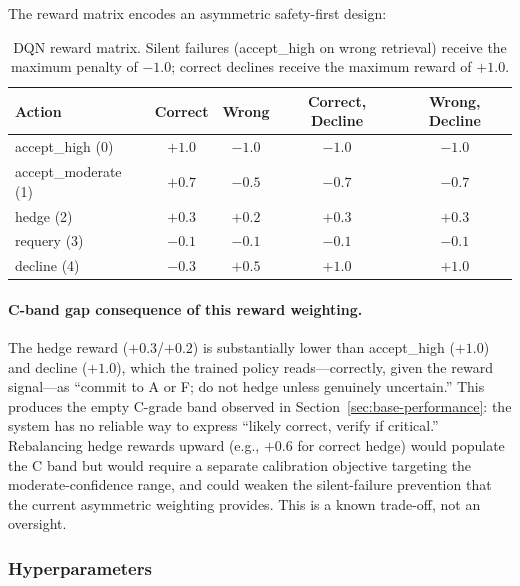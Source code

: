 \documentclass[11pt,letterpaper]{article}
\begin{document}
The reward matrix encodes an asymmetric safety-first design:

\begin{table}[H]
\centering
\small
\begin{tabular}{lcccc}
\toprule
\textbf{Action} & \textbf{Correct} & \textbf{Wrong} & \textbf{Correct, Decline} & \textbf{Wrong, Decline} \\
\midrule
accept\_high (0) & $+1.0$ & $\mathbf{-1.0}$ & $-1.0$ & $-1.0$ \\
accept\_moderate (1) & $+0.7$ & $-0.5$ & $-0.7$ & $-0.7$ \\
hedge (2) & $+0.3$ & $+0.2$ & $+0.3$ & $+0.3$ \\
requery (3) & $-0.1$ & $-0.1$ & $-0.1$ & $-0.1$ \\
decline (4) & $-0.3$ & $+0.5$ & $\mathbf{+1.0}$ & $\mathbf{+1.0}$ \\
\bottomrule
\end{tabular}
\caption{DQN reward matrix. Silent failures (accept\_high on wrong retrieval) receive the maximum penalty of $-1.0$; correct declines receive the maximum reward of $+1.0$.}
\label{tab:reward-matrix}
\end{table}

\paragraph{C-band gap consequence of this reward weighting.} The hedge reward ($+0.3$/$+0.2$) is substantially lower than accept\_high ($+1.0$) and decline ($+1.0$), which the trained policy reads---correctly, given the reward signal---as ``commit to A or F; do not hedge unless genuinely uncertain.'' This produces the empty C-grade band observed in Section~\ref{sec:base-performance}: the system has no reliable way to express ``likely correct, verify if critical.'' Rebalancing hedge rewards upward (e.g., $+0.6$ for correct hedge) would populate the C band but would require a separate calibration objective targeting the moderate-confidence range, and could weaken the silent-failure prevention that the current asymmetric weighting provides. This is a known trade-off, not an oversight.

\subsubsection{Hyperparameters}
\end{document}
